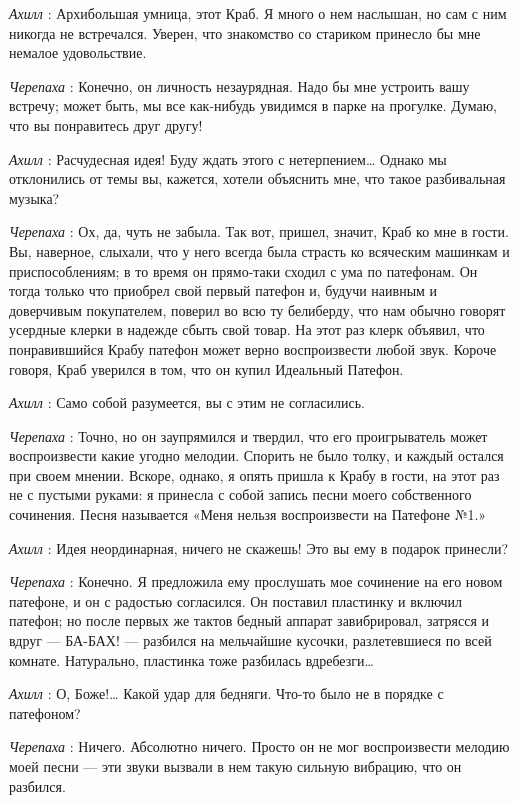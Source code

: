 \emph{Ахилл} : Архибольшая умница, этот Краб. Я много о нем наслышан, но сам с ним никогда не встречался. Уверен, что знакомство со стариком принесло бы мне немалое удовольствие.

\emph{Черепаха} : Конечно, он личность незаурядная. Надо бы мне устроить вашу встречу; может быть, мы все как-нибудь увидимся в парке на прогулке. Думаю, что вы понравитесь друг другу!

\emph{Ахилл} : Расчудесная идея! Буду ждать этого с нетерпением\ldots{} Однако мы отклонились от темы вы, кажется, хотели объяснить мне, что такое разбивальная музыка?

\emph{Черепаха} : Ох, да, чуть не забыла. Так вот, пришел, значит, Краб ко мне в гости. Вы, наверное, слыхали, что у него всегда была страсть ко всяческим машинкам и приспособлениям; в то время он прямо-таки сходил с ума по патефонам. Он тогда только что приобрел свой первый патефон и, будучи наивным и доверчивым покупателем, поверил во всю ту белиберду, что нам обычно говорят усердные клерки в надежде сбыть свой товар. На этот раз клерк объявил, что понравившийся Крабу патефон может верно воспроизвести любой звук. Короче говоря, Краб уверился в том, что он купил Идеальный Патефон.

\emph{Ахилл} : Само собой разумеется, вы с этим не согласились.

\emph{Черепаха} : Точно, но он заупрямился и твердил, что его проигрыватель может воспроизвести какие угодно мелодии. Спорить не было толку, и каждый остался при своем мнении. Вскоре, однако, я опять пришла к Крабу в гости, на этот раз не с пустыми руками: я принесла с собой запись песни моего собственного сочинения. Песня называется «Меня нельзя воспроизвести на Патефоне №1.»

\emph{Ахилл} : Идея неординарная, ничего не скажешь! Это вы ему в подарок принесли?

\emph{Черепаха} : Конечно. Я предложила ему прослушать мое сочинение на его новом патефоне, и он с радостью согласился. Он поставил пластинку и включил патефон; но после первых же тактов бедный аппарат завибрировал, затрясся и вдруг --- БА-БАХ! --- разбился на мельчайшие кусочки, разлетевшиеся по всей комнате. Натурально, пластинка тоже разбилась вдребезги\ldots{}

\emph{Ахилл} : О, Боже!\ldots{} Какой удар для бедняги. Что-то было не в порядке с патефоном?

\emph{Черепаха} : Ничего. Абсолютно ничего. Просто он не мог воспроизвести мелодию моей песни --- эти звуки вызвали в нем такую сильную вибрацию, что он разбился.

